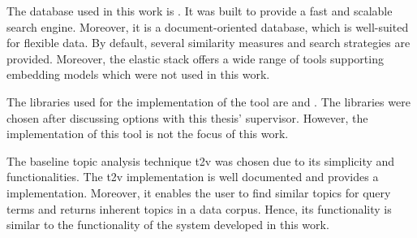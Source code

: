 The database used in this work is \databaseName{}.
It was built to provide a fast and scalable search engine.
Moreover, it is a document-oriented database, which is well-suited for flexible data.
By default, several similarity measures and search strategies are provided.
Moreover, the elastic stack offers a wide range of tools supporting embedding models which were not used in this work.


The libraries used for the implementation of the tool are \angular{} and \flask{}.
The libraries were chosen after discussing options with this thesis' supervisor.
However, the implementation of this tool is not the focus of this work.

The baseline topic analysis technique \ac{t2v} was chosen due to its simplicity and functionalities.
The \ac{t2v} implementation is well documented and provides a \wordcloud{} implementation.
Moreover, it enables the user to find similar topics for query terms and returns inherent topics in a data corpus.
Hence, its functionality is similar to the functionality of the system developed in this work.